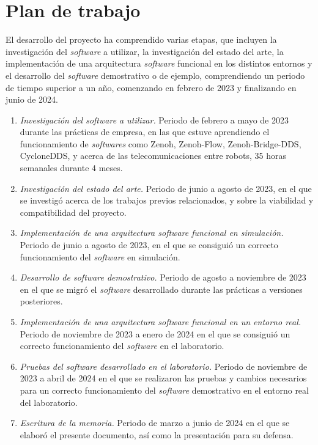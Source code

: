 
\section{Plan de trabajo}
\label{sec:plantrabajo}

El desarrollo del proyecto ha comprendido varias etapas, que incluyen la
investigación del \textit{software} a utilizar, la investigación del estado del
arte, la implementación de una arquitectura \textit{software} funcional en los
distintos entornos y el desarrollo del \textit{software} demostrativo o de
ejemplo, comprendiendo un periodo de tiempo superior a un año, comenzando en
febrero de 2023 y finalizando en junio de 2024.

\begin{enumerate}
    \item{\textit{Investigación del software a utilizar.} Periodo de febrero a
        mayo de 2023 durante las prácticas de empresa, en las que estuve
        aprendiendo el funcionamiento de \textit{softwares} como Zenoh,
        Zenoh-Flow, Zenoh-Bridge-DDS, CycloneDDS, y acerca de las
        telecomunicaciones entre robots, 35 horas semanales durante 4 meses.}
    \item{\textit{Investigación del estado del arte.} Periodo de junio a agosto
        de 2023, en el que se investigó acerca de los trabajos previos
        relacionados, y sobre la viabilidad y compatibilidad del proyecto.}
    \item{\textit{Implementación de una arquitectura software funcional en
        simulación.} Periodo de junio a agosto de 2023, en el que se consiguió
        un correcto funcionamiento del \textit{software} en simulación.}
    \item{\textit{Desarrollo de software demostrativo.} Periodo de agosto a
        noviembre de 2023 en el que se migró el \textit{software} desarrollado
        durante las prácticas a versiones posteriores.}
    \item{\textit{Implementación de una arquitectura software funcional en un
        entorno real.} Periodo de noviembre de 2023 a enero de 2024 en el que se
        consiguió un correcto funcionamiento del \textit{software} en el
        laboratorio.}
    \item{\textit{Pruebas del software desarrollado en el laboratorio.} Periodo
        de noviembre de 2023 a abril de 2024 en el que se realizaron las pruebas
        y cambios necesarios para un correcto funcionamiento del
        \textit{software} demostrativo en el entorno real del laboratorio.}
    \item{\textit{Escritura de la memoria.} Periodo de marzo a junio de 2024 en
        el que se elaboró el presente documento, así como la presentación para
        su defensa.}
\end{enumerate}

